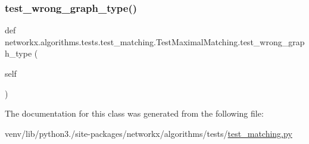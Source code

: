 \subsubsection{\texorpdfstring{test\+\_\+wrong\+\_\+graph\+\_\+type()}{test\_wrong\_graph\_type()}}
{\footnotesize\ttfamily def networkx.\+algorithms.\+tests.\+test\+\_\+matching.\+Test\+Maximal\+Matching.\+test\+\_\+wrong\+\_\+graph\+\_\+type (\begin{DoxyParamCaption}\item[{}]{self }\end{DoxyParamCaption})}



The documentation for this class was generated from the following file\+:\begin{DoxyCompactItemize}
\item 
venv/lib/python3./site-\/packages/networkx/algorithms/tests/\hyperlink{tests_2test__matching_8py}{test\+\_\+matching.\+py}\end{DoxyCompactItemize}
